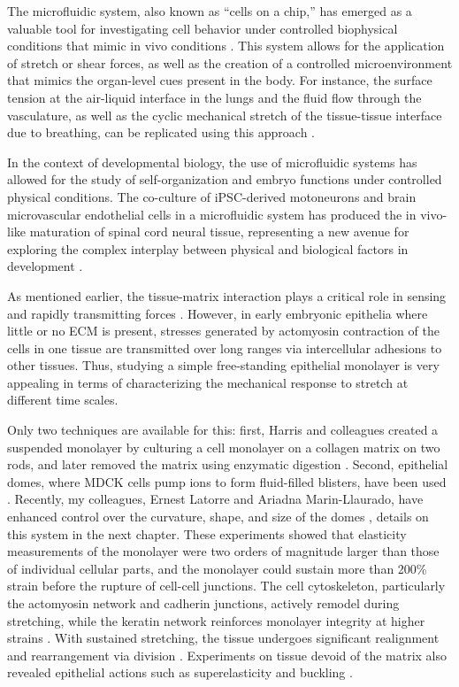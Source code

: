 The microfluidic system, also known as ``cells on a chip,'' has emerged as a valuable tool for investigating cell behavior under controlled biophysical conditions that mimic in vivo conditions \cite{ingber2018}. This
system allows for the application of stretch or shear forces, as well as the creation of a controlled microenvironment that mimics the organ-level cues present in the body. For instance, the surface tension at the air-liquid interface in the lungs and the fluid flow through the vasculature, as well as the cyclic mechanical stretch of the tissue-tissue interface due to breathing, can be replicated using this approach \cite{huh2010}.

In the context of developmental biology, the use of microfluidic systems has allowed for the study of self-organization and embryo functions under controlled physical conditions. The co-culture of iPSC-derived motoneurons and brain microvascular endothelial cells in a microfluidic system has produced the in vivo-like maturation of spinal cord neural tissue, representing a new avenue for exploring the complex interplay between physical and biological factors in development \cite{sances2018, samal2019}.

As mentioned earlier, the tissue-matrix interaction plays a critical role in sensing and rapidly transmitting forces \cite{tambe2011, sunyer2016, serra-picamal2012}. However, in early embryonic epithelia where little or no ECM is present, stresses generated by actomyosin contraction of the cells in one tissue are transmitted over long ranges via intercellular adhesions to other tissues. Thus, studying a simple free-standing epithelial monolayer is very appealing in terms of characterizing the mechanical response to stretch at different time scales.

Only two techniques are available for this: first, Harris and colleagues created a suspended monolayer by culturing a cell monolayer on a collagen matrix on two rods, and later removed the matrix using enzymatic digestion \cite{harris2012}. Second, epithelial domes, where MDCK cells pump ions to form fluid-filled blisters, have been used \cite{lever1979}. Recently, my colleagues, Ernest Latorre and Ariadna Marin-Llaurado, have enhanced control over the curvature, shape, and size of the domes \cite{latorre2018, marin-llaurado2022}, details on this system in the next chapter. These experiments showed that elasticity measurements of the monolayer were two orders of magnitude larger than those of individual cellular parts, and the monolayer could sustain more than 200\% strain before the rupture of cell-cell junctions. The cell cytoskeleton, particularly the actomyosin network and cadherin junctions, actively remodel during stretching, while the keratin network reinforces monolayer integrity at higher strains \cite{latorre2018, duque2023}. With sustained stretching, the tissue undergoes significant realignment and rearrangement via division \cite{wyatt2015}. Experiments on tissue devoid of the matrix also revealed epithelial actions such as superelasticity and buckling \cite{latorre2018, wyatt2020}.

